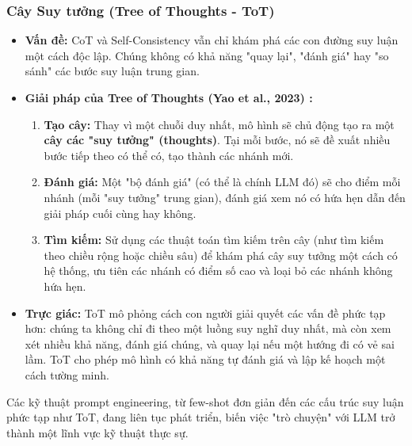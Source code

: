 \subsubsection{Cây Suy tưởng (Tree of Thoughts - ToT)}
\begin{itemize}
    \item \textbf{Vấn đề:} CoT và Self-Consistency vẫn chỉ khám phá các con đường suy luận một cách độc lập. Chúng không có khả năng "quay lại", "đánh giá" hay "so sánh" các bước suy luận trung gian.
    \item \textbf{Giải pháp của Tree of Thoughts (Yao et al., 2023) \cite{yao2023tree}:}
        \begin{enumerate}
            \item \textbf{Tạo cây:} Thay vì một chuỗi duy nhất, mô hình sẽ chủ động tạo ra một \textbf{cây các "suy tưởng" (thoughts)}. Tại mỗi bước, nó sẽ đề xuất nhiều bước tiếp theo có thể có, tạo thành các nhánh mới.
            \item \textbf{Đánh giá:} Một "bộ đánh giá" (có thể là chính LLM đó) sẽ cho điểm mỗi nhánh (mỗi "suy tưởng" trung gian), đánh giá xem nó có hứa hẹn dẫn đến giải pháp cuối cùng hay không.
            \item \textbf{Tìm kiếm:} Sử dụng các thuật toán tìm kiếm trên cây (như tìm kiếm theo chiều rộng hoặc chiều sâu) để khám phá cây suy tưởng một cách có hệ thống, ưu tiên các nhánh có điểm số cao và loại bỏ các nhánh không hứa hẹn.
        \end{enumerate}
    \item \textbf{Trực giác:} ToT mô phỏng cách con người giải quyết các vấn đề phức tạp hơn: chúng ta không chỉ đi theo một luồng suy nghĩ duy nhất, mà còn xem xét nhiều khả năng, đánh giá chúng, và quay lại nếu một hướng đi có vẻ sai lầm. ToT cho phép mô hình có khả năng tự đánh giá và lập kế hoạch một cách tường minh.
\end{itemize}

Các kỹ thuật prompt engineering, từ few-shot đơn giản đến các cấu trúc suy luận phức tạp như ToT, đang liên tục phát triển, biến việc "trò chuyện" với LLM trở thành một lĩnh vực kỹ thuật thực sự.
